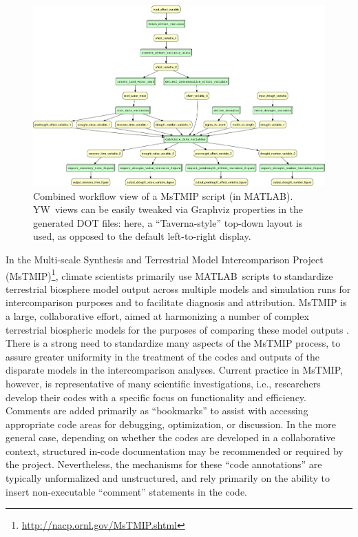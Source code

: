 \documentclass{article}
\newcommand{\yw}{\textsf{YW}}
\newcommand{\MATLAB}{\textsf{MATLAB}}
\begin{document}
  \begin{figure}[t]
   \centering
   \includegraphics[width=.99\textwidth]{figures/MsTMIP_combined-crop.pdf}
   \caption{Combined workflow view of a MsTMIP script (in
     \MATLAB). \yw\ views can be easily tweaked via Graphviz
     properties in the generated DOT files: here, a ``Taverna-style''
     top-down layout is used, as opposed to the default left-to-right
     display.}
   \label{fig-mstmip}
 \end{figure}


In the Multi-scale Synthesis and Terrestrial Model Intercomparison
Project (MsTMIP)\footnote{\url{http://nacp.ornl.gov/MsTMIP.shtml}},
climate scientists primarily use \MATLAB\ scripts to standardize
terrestrial biosphere model output across multiple models and
simulation runs for intercomparison purposes and to facilitate
diagnosis and attribution.
MsTMIP is a large, collaborative effort, aimed at harmonizing a number
of complex terrestrial biospheric models for the purposes of comparing
these model outputs \cite{huntzinger2013north}. There is a strong need
to standardize many aspects of the MsTMIP process, to assure greater
uniformity in the treatment of the codes and outputs of the disparate
models in the intercomparison analyses. Current practice in MsTMIP,
however, is representative of many scientific investigations, i.e.,
researchers develop their codes with a specific focus on functionality
and efficiency. Comments are added primarily as ``bookmarks'' to
assist with accessing appropriate code areas for debugging,
optimization, or discussion. In the more general case, depending on
whether the codes are developed in a collaborative context, structured
in-code documentation may be recommended or required by the
project. Nevertheless,  the mechanisms for these ``code annotations'' are
typically unformalized and unstructured, and rely primarily on the
ability to insert non-executable ``comment'' statements in the code.
\end{document}
